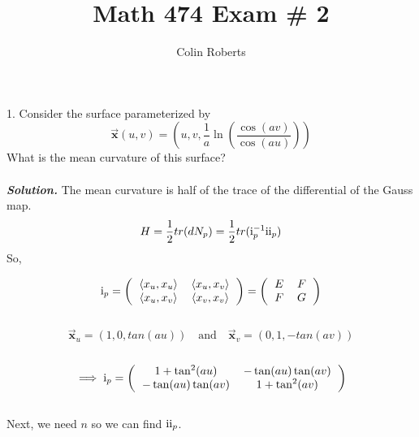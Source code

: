 \documentclass[11pt,letterpaper]{article}
\author{Colin Roberts}
\title{Math 474 Exam \# 2}
\begin{document}
\maketitle
\newcommand{\RN}[1]{%
	\textup{\uppercase\expandafter{\romannumeral#1}}}
\newcommand\Ireqn[2]{\noindent\makebox[\textwidth]{$\displaystyle#1$\hfill{#2}}\vspace{2ex}}
\pagebreak


\setlength{\parindent}{0cm}
1. Consider the surface parameterized by
\[
\vec{\mathbf{x}}(u,v)=\left(u,v,\frac{1}{a} \ln\left(\frac{\cos(av)}{\cos(au)}\right)\right)
\]
What is the mean curvature of this surface?
\\
\\
\textit{\textbf{Solution.}}
The mean curvature is half of the trace of the differential of the Gauss map.
\[H = \frac{1}{2}tr(dN_p ) = \frac{1}{2}tr(\RN{1}_p^{-1}\RN{2}_p)
\]
So,

\[\RN{1}_p = \left(
	\begin{tabular}{cc}
	$\langle x_u , x_u \rangle$ & $\langle x_u , x_v \rangle$ \\
	$\langle x_u , x_v \rangle$ & $\langle x_v , x_v \rangle$
	\end{tabular}
	\right)
	= \left(
	\begin{tabular}{cc}
	$E$ & $F$ \\
$F$ & $G$
	\end{tabular}\right)
\]
\\
\[\vec{\mathbf{x}}_u = \left(1,0,tan(au)\right) \quad \textrm{and}\quad \vec{\mathbf{x}}_v = \left(0,1,-tan(av)\right)
\]
\\
\[\implies \RN{1}_p = \left(\begin{tabular}{cc}
$1 + \tan^2(au)$ & $-\tan(au)\tan(av)$\\
$-\tan(au)\tan(av)$ & $1 + \tan^2(av$)
\end{tabular}\right)
\]
\\
Next, we need $n$ so we can find $\RN{2}_p$.\\
\end{document}
